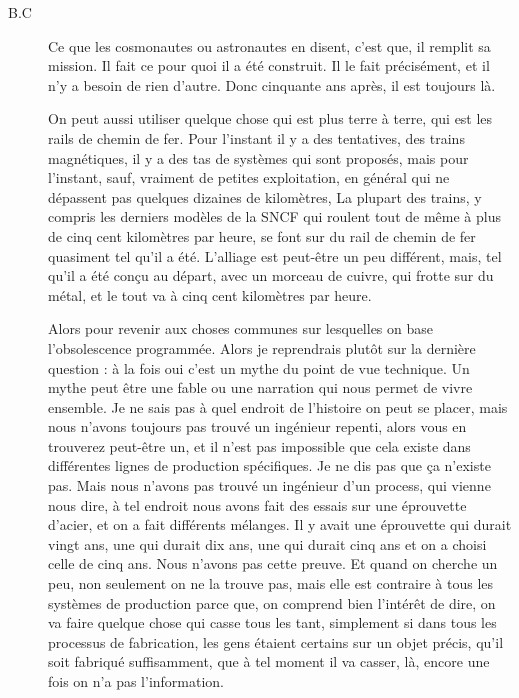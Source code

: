 \begin{description}
\vspace{1\baselineskip}

\item[B.C]Ce que les cosmonautes ou astronautes en disent, c'est que, il remplit sa mission. Il fait ce pour quoi il a été construit. Il le fait précisément, et il n'y a besoin de rien d'autre. Donc cinquante ans après, il est toujours là. 

On peut aussi utiliser quelque chose qui est plus terre à terre, qui est les rails de chemin de fer. Pour l'instant il y a des tentatives, des trains magnétiques, il y a des tas de systèmes qui sont proposés, mais pour l'instant, sauf, vraiment de petites exploitation, en général qui ne dépassent pas quelques dizaines de kilomètres, La plupart des trains, y compris les derniers modèles de la SNCF qui roulent tout de même à plus de cinq cent kilomètres par heure, se font sur du rail de chemin de fer quasiment tel qu'il a été. L'alliage est peut-être un peu différent, mais, tel qu'il a été conçu au départ, avec un morceau de cuivre, qui frotte sur du métal, et le tout va à  cinq cent kilomètres par heure. 

Alors pour revenir aux choses communes sur lesquelles on base l'obsolescence programmée. Alors je reprendrais plutôt sur la dernière question : à la fois oui c'est un mythe du point de vue technique. Un mythe peut être une fable ou une narration qui nous permet de vivre ensemble. Je ne sais pas à quel endroit de l'histoire on peut se placer, mais nous n'avons toujours pas trouvé un ingénieur repenti, alors vous en trouverez peut-être un, et il n'est pas impossible que cela existe dans différentes lignes de production spécifiques. Je ne dis pas que ça n'existe pas. Mais nous n'avons pas trouvé un ingénieur d'un process, qui vienne nous dire, à tel endroit nous avons fait des essais sur une éprouvette d'acier, et on a fait différents mélanges. Il y avait une éprouvette qui durait vingt ans, une qui durait dix ans, une qui durait cinq ans et on a choisi celle de cinq ans. Nous n'avons pas cette  preuve. Et quand on cherche un peu, non seulement on ne la trouve pas, mais elle est contraire à tous les systèmes de production parce que, on comprend bien l’intérêt de dire, on va faire quelque chose qui casse tous les tant, simplement si dans tous les processus de fabrication, les gens étaient certains sur un objet précis, qu'il soit fabriqué suffisamment, que à tel moment il va casser, là, encore une fois on n'a pas l'information.

\vspace{1\baselineskip}


\end{description}

